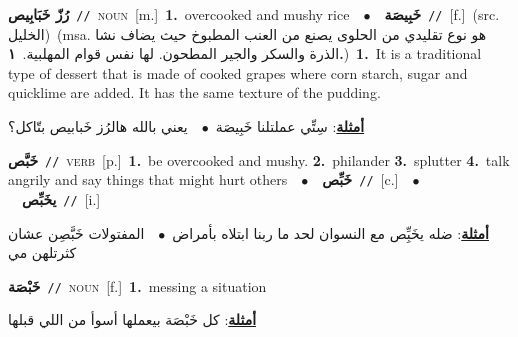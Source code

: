 \documentclass[10pt,a4paper,twoside]{article} %
\begin{document}
\begin{multicols}{2}
{\setlength\topsep{0pt}\textbf{\foreignlanguage{arabic}{رُزّ خَبَابِيص}}\ {\color{gray}\texttt{//}\color{black}}\ \textsc{noun}\ [m.]\ \textbf{1.}~overcooked and mushy rice\ \ $\bullet$\ \ \setlength\topsep{0pt}\textbf{\foreignlanguage{arabic}{خَبِيصَة}}\ {\color{gray}\texttt{//}\color{black}}\ [f.]\ (src. \color{gray}\foreignlanguage{arabic}{الخليل}\color{black})\ \color{gray}(msa. \foreignlanguage{arabic}{هو نوع تقليدي من الحلوى يصنع من العنب المطبوخ حيث يضاف نشا الذرة والسكر والجير المطحون. لها نفس قوام المهلبية.}~\foreignlanguage{arabic}{\textbf{١.}})\color{black}\ \textbf{1.}~It is a traditional type of dessert that is made of cooked grapes where corn starch, sugar  and quicklime are added. It has the same texture of the pudding.\  \begin{flushright}\color{gray}\foreignlanguage{arabic}{\textbf{\underline{\foreignlanguage{arabic}{أمثلة}}}: سِتِّي عملتلنا خَبِيصَة\ $\bullet$\ \  يعني بالله هالرُز خَبابيص بتّاكل؟}\end{flushright}\color{black}} \vspace{2mm}

{\setlength\topsep{0pt}\textbf{\foreignlanguage{arabic}{خَبَّص}}\ {\color{gray}\texttt{//}\color{black}}\ \textsc{verb}\ [p.]\ \textbf{1.}~be overcooked and mushy.  \textbf{2.}~philander  \textbf{3.}~splutter  \textbf{4.}~talk angrily and say things that might hurt others\ \ $\bullet$\ \ \setlength\topsep{0pt}\textbf{\foreignlanguage{arabic}{خَبِّص}}\ {\color{gray}\texttt{//}\color{black}}\ [c.]\ \ $\bullet$\ \ \setlength\topsep{0pt}\textbf{\foreignlanguage{arabic}{يخَبِّص}}\ {\color{gray}\texttt{//}\color{black}}\ [i.]\  \begin{flushright}\color{gray}\foreignlanguage{arabic}{\textbf{\underline{\foreignlanguage{arabic}{أمثلة}}}: ضله يخَبِِّص مع النسوان لحد ما ربنا ابتلاه بأمراض\ $\bullet$\ \  المفتولات خَبَّصِن عشان كثرتلهن مي}\end{flushright}\color{black}} \vspace{2mm}

{\setlength\topsep{0pt}\textbf{\foreignlanguage{arabic}{خَبْصَة}}\ {\color{gray}\texttt{//}\color{black}}\ \textsc{noun}\ [f.]\ \textbf{1.}~messing a situation\  \begin{flushright}\color{gray}\foreignlanguage{arabic}{\textbf{\underline{\foreignlanguage{arabic}{أمثلة}}}: كل خَبْصَة بيعملها أسوأ من اللي قبلها}\end{flushright}\color{black}} \vspace{2mm}


\end{multicols}
\end{document}
